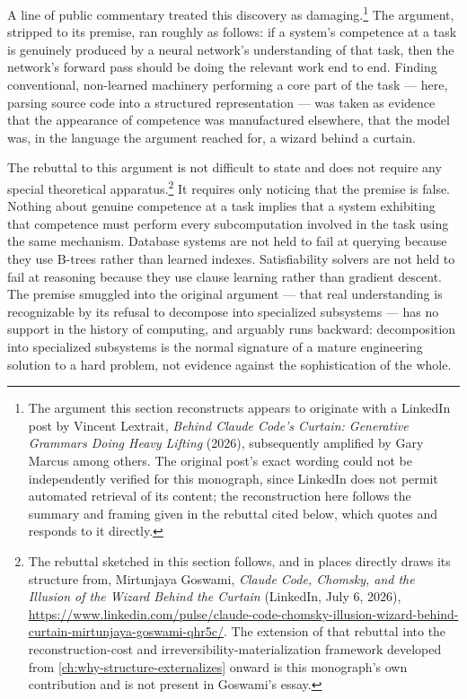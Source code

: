 \documentclass[11pt]{book}
\theoremstyle{plain}
\theoremstyle{definition}
\theoremstyle{remark}
\begin{document}
A line of public commentary treated this discovery as damaging.\footnote{The
argument this section reconstructs appears to originate with a LinkedIn
post by Vincent Lextrait, \emph{Behind Claude Code's Curtain:
Generative Grammars Doing Heavy Lifting} (2026), subsequently
amplified by Gary Marcus among others. The original post's exact
wording could not be independently verified for this monograph, since
LinkedIn does not permit automated retrieval of its content; the
reconstruction here follows the summary and framing given in the
rebuttal cited below, which quotes and responds to it directly.} The
argument, stripped to its premise, ran roughly as follows: if a
system's competence at a task is genuinely produced by a neural
network's understanding of that task, then the network's forward pass
should be doing the relevant work end to end. Finding conventional,
non-learned machinery performing a core part of the task --- here,
parsing source code into a structured representation --- was taken as
evidence that the appearance of competence was manufactured elsewhere,
that the model was, in the language the argument reached for, a wizard
behind a curtain.

The rebuttal to this argument is not difficult to state and does not
require any special theoretical apparatus.\footnote{The rebuttal
sketched in this section follows, and in places directly draws its
structure from, Mirtunjaya Goswami, \emph{Claude Code, Chomsky, and
the Illusion of the Wizard Behind the Curtain} (LinkedIn, July 6,
2026), \url{https://www.linkedin.com/pulse/claude-code-chomsky-illusion-wizard-behind-curtain-mirtunjaya-goswami-qhr5c/}.
The extension of that rebuttal into the reconstruction-cost and
irreversibility-materialization framework developed from
\cref{ch:why-structure-externalizes} onward is this monograph's own
contribution and is not present in Goswami's essay.} It requires only
noticing that the premise is false. Nothing about genuine competence at a
task implies that a system exhibiting that competence must perform
every subcomputation involved in the task using the same mechanism.
Database systems are not held to fail at querying because they use
B-trees rather than learned indexes. Satisfiability solvers are not
held to fail at reasoning because they use clause learning rather than
gradient descent. The premise smuggled into the original argument ---
that real understanding is recognizable by its refusal to decompose
into specialized subsystems --- has no support in the history of
computing, and arguably runs backward: decomposition into specialized
subsystems is the normal signature of a mature engineering solution to
a hard problem, not evidence against the sophistication of the whole.
\end{document}
